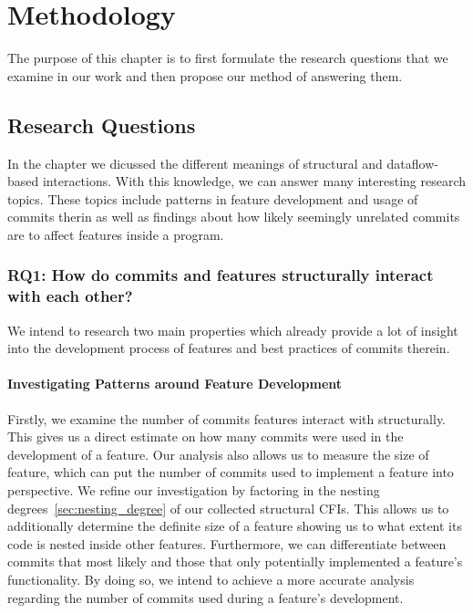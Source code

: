 \chapter{Methodology}\label{ch:methodology}

The purpose of this chapter is to first formulate the research questions that we examine in our work
and then propose our method of answering them.

\section{Research Questions}\label{sec:research_questions}

In the  chapter we dicussed the different meanings of structural and dataflow-based interactions.
With this knowledge, we can answer many interesting research topics. 
These topics include patterns in feature development and usage of commits therin as well as findings about how likely seemingly unrelated commits are to affect features inside a program.

\subsection*{\textbf{RQ1: How do commits and features structurally interact with each other?}}

We intend to research two main properties which already provide a lot of insight into the development process of features and best practices of commits therein.

\subsubsection*{Investigating Patterns around Feature Development}

Firstly, we examine the number of commits features interact with structurally. 
This gives us a direct estimate on how many commits were used in the development of a feature.
Our analysis also allows us to measure the size of feature, which can put the number of commits used to implement a feature into perspective.
We refine our investigation by factoring in the nesting degrees~\ref{sec:nesting_degree} of our collected structural CFIs.
This allows us to additionally determine the \textsf{definite} size of a feature showing us to what extent its code is nested inside other features.
Furthermore, we can differentiate between commits that most likely and those that only potentially implemented a feature's functionality.
By doing so, we intend to achieve a more accurate analysis regarding the number of commits used during a feature's development.

